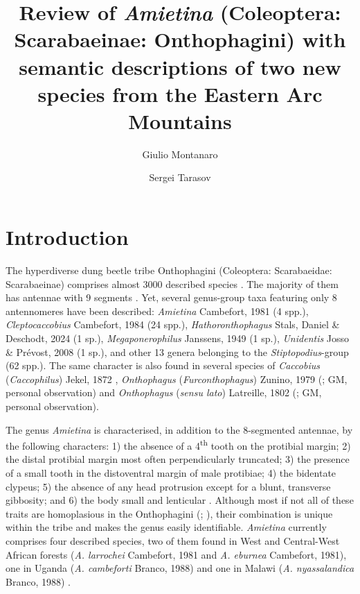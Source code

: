 \documentclass[fleqn,10pt,lineno]{wlpeerj}
\title{Review of \textit{Amietina} (Coleoptera: Scarabaeinae: Onthophagini) with semantic descriptions of two new species from the Eastern Arc Mountains}
\author[1,2]{Giulio Montanaro}
\author[1]{Sergei Tarasov}
\affil[1]{Finnish Museum of Natural History, Pohjoinen Rautatiekatu 13, FI-00014 Helsinki, Finland}
\affil[2]{Association Catharsius, Paris, France}
\begin{document}
\flushbottom
\maketitle
\thispagestyle{empty}

\section*{Introduction}

The hyperdiverse dung beetle tribe Onthophagini (Coleoptera: Scarabaeidae: Scarabaeinae) comprises almost 3000 described species \citep{schoolmeesters2021scarabs}. The majority of them has antennae with 9 segments \citep{cambefort1981amietina}. Yet, several genus-group taxa featuring only 8 antennomeres have been described: \textit{Amietina} Cambefort, 1981 (4 spp.), \textit{Cleptocaccobius} Cambefort, 1984 (24 spp.), \textit{Hathoronthophagus} Stals, Daniel \& Deschodt, 2024 (1 sp.), \textit{Megaponerophilus} Janssens, 1949 (1 sp.), \textit{Unidentis} Josso \& Prévost, 2008 (1 sp.), and other 13 genera belonging to the \textit{Stiptopodius}-group \citep{branco1989etude, branco1992essai, schoolmeesters2021scarabs} (62 spp.). The same character is also found in several species of \textit{Caccobius} (\textit{Caccophilus}) Jekel, 1872 \citep{cambefort1979donnees}, \textit{Onthophagus} (\textit{Furconthophagus}) Zunino, 1979 (\citealp{cambefort1986une}; GM, personal observation) and \textit{Onthophagus} (\textit{sensu lato}) Latreille, 1802 (\citealp{cambefort1981amietina}; GM, personal observation). 

The genus \textit{Amietina} is characterised, in addition to the 8-segmented antennae, by the following characters: 1) the absence of a 4\textsuperscript{th} tooth on the protibial margin; 2) the distal protibial margin most often perpendicularly truncated; 3) the presence of a small tooth in the distoventral margin of male protibiae; 4) the bidentate clypeus; 5) the absence of any head protrusion except for a blunt, transverse gibbosity; and 6) the body small and lenticular \citep{branco1988deux, cambefort1981amietina}. Although most if not all of these traits are homoplasious in the Onthophagini (\citealp{philips2016phylogeny}; \citealp{tarasov2011phylogenetic}), their combination is unique within the tribe and makes the genus easily identifiable. \textit{Amietina} currently comprises four described species, two of them found in West and Central-West African forests (\textit{A. larrochei} Cambefort, 1981 and \textit{A. eburnea} Cambefort, 1981), one in Uganda (\textit{A. cambeforti} Branco, 1988) and one in Malawi (\textit{A. nyassalandica} Branco, 1988) \citep{branco1988deux, cambefort1981amietina}.
\end{document}
